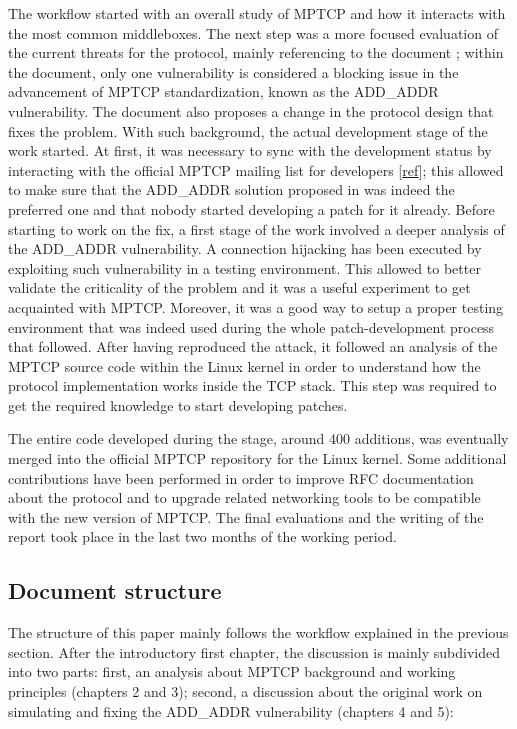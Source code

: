 The workflow started with an overall study of MPTCP and how it interacts with the most common middleboxes. The next step was a more focused evaluation of the current threats for the protocol, mainly referencing to the document ; within the document, only one vulnerability is considered a blocking issue in the advancement of MPTCP standardization, known as the ADD\_ADDR vulnerability. The document also proposes a change in the protocol design that fixes the problem. With such background, the actual development stage of the work started. At first, it was necessary to sync with the development status by interacting with the official MPTCP mailing list for developers [\href{https://listes-2.sipr.ucl.ac.be/sympa}{ref}]; this allowed to make sure that the ADD\_ADDR solution proposed in  was indeed the preferred one and that nobody started developing a patch for it already.
Before starting to work on the fix, a first stage of the work involved a deeper analysis of the ADD\_ADDR vulnerability. A connection hijacking has been executed by exploiting such vulnerability in a testing environment. This allowed to better validate the criticality of the problem and it was a useful experiment to get acquainted with MPTCP. Moreover, it was a good way to setup a proper testing environment that was indeed used during the whole patch-development process that followed.
After having reproduced the attack, it followed an analysis of the MPTCP source code within the Linux kernel in order to understand how the protocol implementation works inside the TCP stack. This step was required to get the required knowledge to start developing patches. 


The entire code developed during the stage, around 400 additions, was eventually merged into the official MPTCP repository for the Linux kernel. Some additional contributions have been performed in order to improve RFC documentation about the protocol and to upgrade related networking tools to be compatible with the new version of MPTCP.
The final evaluations and the writing of the report took place in the last two months of the working period.

\subsection{Document structure}
The structure of this paper mainly follows the workflow explained in the previous section. After the introductory first chapter, the discussion is mainly subdivided into two parts: first, an analysis about MPTCP background and working principles (chapters 2 and 3); second, a discussion about the original work on simulating and fixing the ADD\_ADDR vulnerability (chapters 4 and 5):

